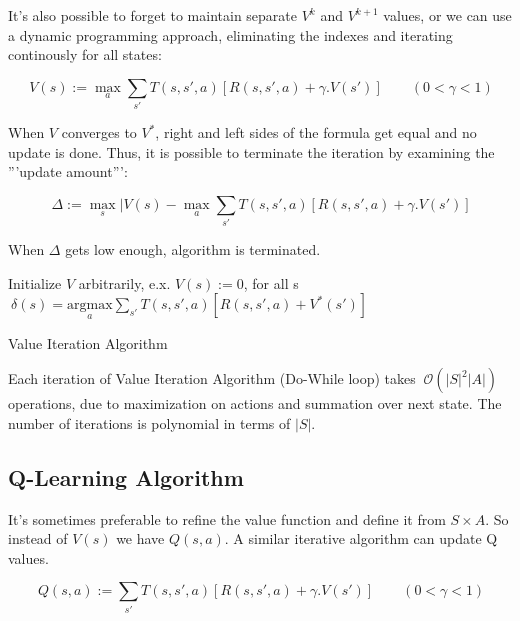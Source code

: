 It's also possible to forget to maintain separate $V^k$ and $V^{k+1}$ values, or we can use a dynamic programming approach, eliminating the indexes and iterating continously for all states:

\begin{displaymath}
\ V(s) := \max_a \sum_{s'} T(s ,s', a) [ R(s, s', a) + \gamma . V (s')] \qquad (0 < \gamma <1 )
\end{displaymath}

When $V$ converges to $V^*$, right and left sides of the formula get equal and no update is done. Thus, it is possible to terminate the iteration by examining the '''update amount''':

\begin{displaymath}
\ \Delta := \max_s | V(s) - \max_a \sum_{s'} T(s ,s', a) [ R(s, s', a) + \gamma . V(s')]
\end{displaymath}

When $\Delta$ gets low enough, algorithm is terminated.

\begin{algorithm}
\SetLine
   Initialize $V$ arbitrarily, e.x. $V(s) := 0$, for all s\;
   $\ \delta(s) = \underset{a}{\mbox{argmax}} \sum_{s'} T(s,s',a) [ R(s, s', a) + V^* (s')]$\;
\caption{Value Iteration Algorithm}\label{figure:valueiterationalgorithm}
\end{algorithm}

Each iteration of Value Iteration Algorithm (Do-While loop) takes $\ \mathcal{O} (|S|^2|A|)$ operations, due to maximization on actions and summation over next state. The number of iterations is polynomial in terms of $|S|$.

\subsection{Q-Learning Algorithm}

It's sometimes preferable to refine the value function and define it from $S \times A$. So instead of $V(s)$ we have $Q(s,a)$. A similar iterative algorithm can update Q values.

\begin{displaymath}
\ Q(s,a) := \sum_{s'} T(s ,s', a) [ R(s, s', a) + \gamma . V (s')] \qquad (0 < \gamma <1 )
\end{displaymath}

